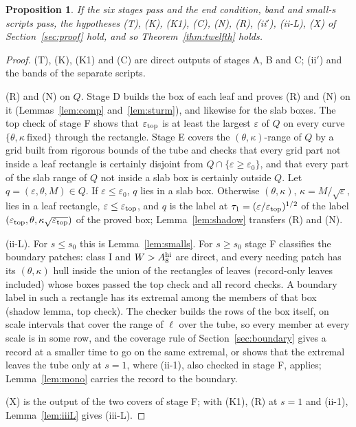 \documentclass[11pt]{article}
\newtheorem{proposition}[theorem]{Proposition}
\theoremstyle{definition}
\begin{document}
\begin{proposition}\label{prop:checker}
If the six stages pass and the end condition, band and small-$s$ scripts pass, the hypotheses (T), (K), (K1), (C),
(N), (R), (ii$'$), (ii-L), (X) of Section~\ref{sec:proof} hold, and so Theorem~\ref{thm:twelfth} holds.
\end{proposition}
\begin{proof}
(T), (K), (K1) and (C) are direct outputs of stages A, B and C; (ii$'$) and the bands of the separate scripts.

(R) and (N) on $Q$. Stage D builds the box of each leaf and proves (R) and (N) on it (Lemmas~\ref{lem:comp}
and~\ref{lem:sturm}), and likewise for the slab boxes. The top check of stage F shows that $\varepsilon_{\rm top}$ is at
least the largest $\varepsilon$ of $Q$ on every curve $\{\theta,\kappa\ \text{fixed}\}$ through the rectangle. Stage E
covers the $(\theta,\kappa)$-range of $Q$ by a grid built from rigorous bounds of the tube and checks that every grid part
not inside a leaf rectangle is certainly disjoint from $Q\cap\{\varepsilon\ge\varepsilon_0\}$, and that every part of
the slab range of $Q$ not inside a slab box is certainly outside $Q$. Let $q=(\varepsilon,\theta,M)\in Q$. If $\varepsilon\le\varepsilon_0$, $q$ lies in a
slab box. Otherwise $(\theta,\kappa)$, $\kappa=M/\sqrt\varepsilon$, lies in a leaf rectangle,
$\varepsilon\le\varepsilon_{\rm top}$, and $q$ is the label at $\tau_1=(\varepsilon/\varepsilon_{\rm top})^{1/2}$ of the
label $(\varepsilon_{\rm top},\theta,\kappa\sqrt{\varepsilon_{\rm top}})$ of the proved box; Lemma~\ref{lem:shadow}
transfers (R) and (N).

(ii-L). For $s\le s_0$ this is Lemma~\ref{lem:smalls}. For $s\ge s_0$ stage F classifies the boundary patches: class I
and $W>A_8^{\rm hi}$ are direct, and every needing patch has its $(\theta,\kappa)$ hull inside the union of the
rectangles of leaves (record-only leaves included) whose boxes passed the top check and all record checks. A
boundary label in such a rectangle has its extremal among the members of that box (shadow lemma, top check). The
checker builds the rows of the box itself, on scale intervals that cover the range of $\ell$ over the tube, so every
member at every scale is in some row, and the coverage rule of Section~\ref{sec:boundary} gives a record at a smaller
time to go on the same extremal, or shows that the extremal leaves the tube only at $s=1$, where (ii-1), also checked in
stage F, applies; Lemma~\ref{lem:mono} carries the record to the boundary.

(X) is the output of the two covers of stage F; with (K1), (R) at $s=1$ and (ii-1), Lemma~\ref{lem:iiiL} gives
(iii-L).
\end{proof}
\end{document}
